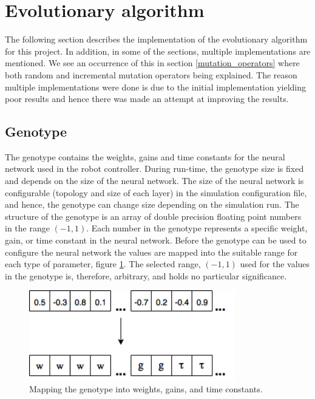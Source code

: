 			
\section{Evolutionary algorithm}
The following section describes the implementation of the evolutionary algorithm for this project.
In addition, in some of the sections, multiple implementations are mentioned.
We see an occurrence of this in section \ref{mutation_operators} where both random and incremental mutation operators being explained.
The reason multiple implementations were done is due to the initial implementation yielding poor results and hence there was made an attempt at improving the results.

\subsection{Genotype}
\label{sec:genotype}
The genotype contains the weights, gains and time constants for the neural network used in the robot controller.
During run-time, the genotype size is fixed and depends on the size of the neural network.
The size of the neural network is configurable (topology and size of each layer) in the simulation configuration file, and hence, the genotype can change size depending on the simulation run.
The structure of the genotype is an array of double precision floating point numbers in the range $(-1, 1)$.
Each number in the genotype represents a specific weight, gain, or time constant in the neural network.
Before the genotype can be used to configure the neural network the values are mapped into the suitable range for each type of parameter, figure \ref{fig:genotype-mapping}.
The selected range, $(-1, 1)$ used for the values in the genotype is, therefore, arbitrary, and holds no particular significance. 

\begin{figure}[H]        
	\centering
	\includegraphics[width=0.80\textwidth, clip]{chapters/res/genotype_translation.png}
	\caption{Mapping the genotype into weights, gains, and time constants.}
	\label{fig:genotype-mapping}
\end{figure}


